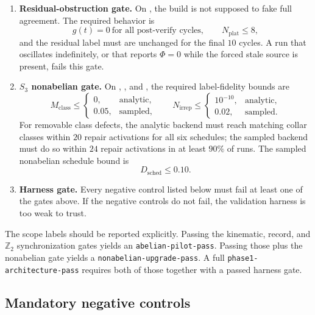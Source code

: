 \documentclass[11pt]{article}
\begin{document}
\begin{enumerate}[leftmargin=2em]
\begin{equation}
\end{equation}
\item \textbf{Residual-obstruction gate.}
On , the build is not supposed to fake full agreement. The
required behavior is
\begin{equation}
g(t)=0\ \text{for all post-verify cycles},
\qquad
N_{\mathrm{plat}}\le 8,
\end{equation}
and the residual label must are unchanged for the final $10$ cycles. A run that oscillates
indefinitely, or that reports $\Phi=0$ while the forced stale source is present, fails
this gate.
\item \textbf{$S_3$ nonabelian gate.}
On , , and
, the required label-fidelity bounds are
\begin{equation}
M_{\mathrm{class}}\le
\begin{cases}
0, & \text{analytic},\\
0.05, & \text{sampled},
\end{cases}
\qquad
N_{\mathrm{irrep}}\le
\begin{cases}
10^{-10}, & \text{analytic},\\
0.02, & \text{sampled}.
\end{cases}
\end{equation}
For removable class defects, the analytic backend must reach matching collar classes within $20$
repair activations for all six schedules; the sampled backend must do so within $24$ repair
activations in at least $90\%$ of runs. The sampled nonabelian schedule bound is
\begin{equation}
D_{\mathrm{sched}}\le 0.10.
\end{equation}
\item \textbf{Harness gate.}
Every negative control listed below must fail at least one of the gates above. If the negative
controls do not fail, the validation harness is too weak to trust.
\end{enumerate}

The scope labels should be reported explicitly. Passing the kinematic, record, and
$\mathbb Z_2$ synchronization gates yields an \texttt{abelian-pilot-pass}. Passing those plus
the nonabelian gate yields a \texttt{nonabelian-upgrade-pass}. A full
\texttt{phase1-architecture-pass} requires both of those together with a passed harness gate.

\subsection{Mandatory negative controls}
\end{document}
